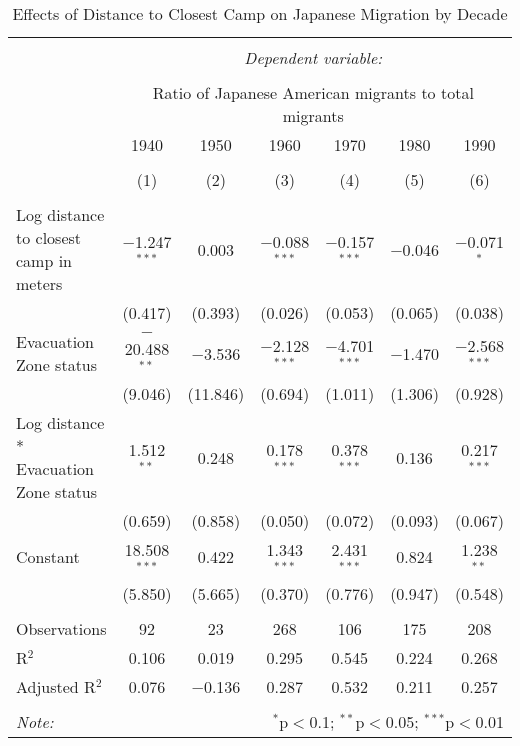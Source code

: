
\begin{table}[!htbp] \centering 
  \caption{Effects of Distance to Closest Camp on Japanese Migration by Decade} 
  \label{} 
\begin{tabular}{@{\extracolsep{5pt}}lcccccc} 
\\[-1.8ex]\hline 
\hline \\[-1.8ex] 
 & \multicolumn{6}{c}{\textit{Dependent variable:}} \\ 
\cline{2-7} 
\\[-1.8ex] & \multicolumn{6}{c}{Ratio of Japanese American migrants to total migrants} \\ 
 & 1940 & 1950 & 1960 & 1970 & 1980 & 1990 \\ 
\\[-1.8ex] & (1) & (2) & (3) & (4) & (5) & (6)\\ 
\hline \\[-1.8ex] 
 Log distance to closest camp in meters & $-$1.247$^{***}$ & 0.003 & $-$0.088$^{***}$ & $-$0.157$^{***}$ & $-$0.046 & $-$0.071$^{*}$ \\ 
  & (0.417) & (0.393) & (0.026) & (0.053) & (0.065) & (0.038) \\ 
  Evacuation Zone status & $-$20.488$^{**}$ & $-$3.536 & $-$2.128$^{***}$ & $-$4.701$^{***}$ & $-$1.470 & $-$2.568$^{***}$ \\ 
  & (9.046) & (11.846) & (0.694) & (1.011) & (1.306) & (0.928) \\ 
  Log distance * Evacuation Zone status & 1.512$^{**}$ & 0.248 & 0.178$^{***}$ & 0.378$^{***}$ & 0.136 & 0.217$^{***}$ \\ 
  & (0.659) & (0.858) & (0.050) & (0.072) & (0.093) & (0.067) \\ 
  Constant & 18.508$^{***}$ & 0.422 & 1.343$^{***}$ & 2.431$^{***}$ & 0.824 & 1.238$^{**}$ \\ 
  & (5.850) & (5.665) & (0.370) & (0.776) & (0.947) & (0.548) \\ 
 \hline \\[-1.8ex] 
Observations & 92 & 23 & 268 & 106 & 175 & 208 \\ 
R$^{2}$ & 0.106 & 0.019 & 0.295 & 0.545 & 0.224 & 0.268 \\ 
Adjusted R$^{2}$ & 0.076 & $-$0.136 & 0.287 & 0.532 & 0.211 & 0.257 \\ 
\hline 
\hline \\[-1.8ex] 
\textit{Note:}  & \multicolumn{6}{r}{$^{*}$p$<$0.1; $^{**}$p$<$0.05; $^{***}$p$<$0.01} \\ 
\end{tabular} 
\end{table} 
